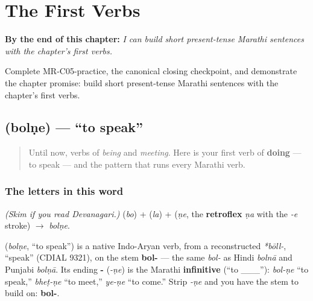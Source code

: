 
\chapter{The First Verbs}
\label{ch:first-verbs}

\begin{chapteropening}
\textbf{By the end of this chapter:} \emph{I can build short present-tense Marathi sentences with the chapter's first verbs.}

Complete MR-C05-practice, the canonical closing checkpoint, and demonstrate the chapter promise: build short present-tense Marathi sentences with the chapter's first verbs.
\end{chapteropening}

\section[\texorpdfstring{\mr{बोलणे} (bolṇe)}{बोलणे (bolṇe)}]{ (bolṇe) — \textquotedblleft{}to speak\textquotedblright{}}

\label{lesson:MR-C05-bolne}



\begin{quote}
Until now, verbs of \emph{being} and \emph{meeting}. Here is your first verb of \textbf{doing} — to speak — and the pattern that runs every Marathi verb.
\end{quote}

\subsection*{The letters in this word}
\emph{(Skim if you read Devanagari.)} \textbf{} (\emph{bo}) + \textbf{} (\emph{la}) + \textbf{} (\emph{ṇe}, the \textbf{retroflex}  \emph{ṇa} with the \emph{-e} stroke) $\to$ \textbf{} \emph{bolṇe}.

\begin{cousinweb}
\textbf{} (\emph{bolṇe}, \textquotedblleft{}to speak\textquotedblright{}) is a native Indo-Aryan verb, from a reconstructed \emph{*bōll-}, \textquotedblleft{}speak\textquotedblright{} (CDIAL 9321), on the stem \textbf{bol-} — the same \emph{bol-} as Hindi \emph{bolnā} and Punjabi \emph{bolṇā}. Its ending \textbf{-} (\emph{-ṇe}) is the Marathi \textbf{infinitive} (\textquotedblleft{}to \_\_\_\textquotedblright{}): \emph{bol-ṇe} \textquotedblleft{}to speak,\textquotedblright{} \emph{bheṭ-ṇe} \textquotedblleft{}to meet,\textquotedblright{} \emph{ye-ṇe} \textquotedblleft{}to come.\textquotedblright{} Strip \emph{-ṇe} and you have the stem to build on: \textbf{bol-}.
\end{cousinweb}

